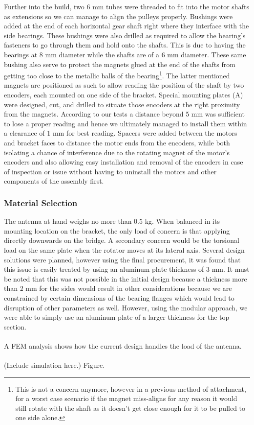 Further into the build, two 6 mm tubes were threaded to fit into the motor shafts as extensions so we can manage to align the pulleys properly. Bushings were added at the end of each horizontal gear shaft right where they interface with the side bearings. These bushings were also drilled as required to allow the bearing's fasteners to go through them and hold onto the shafts. This is due to having the bearings at 8 mm diameter while the shafts are of a 6 mm diameter. These same bushing also serve to protect the magnets glued at the end of the shafts from getting too close to the metallic balls of the bearing\footnote{This is not a concern anymore, however in a previous method of attachment, for a worst case scenario if the magnet miss-aligns for any reason it would still rotate with the shaft as it doesn't get close enough for it to be pulled to one side alone.}. The latter mentioned magnets are positioned as such to allow reading the position of the shaft by two encoders, each mounted on one side of the bracket. Special mounting plates (A) were designed, cut, and drilled to situate those encoders at the right proximity from the magnets. According to our tests a distance beyond 5 mm was sufficient to lose a proper reading and hence we ultimately managed to install them within a clearance of 1 mm for best reading. Spacers were added between the motors and bracket faces to distance the motor ends from the encoders, while both isolating a chance of interference due to the rotating magnet of the motor's encoders and also allowing easy installation and removal of the encoders in case of inspection or issue without having to uninstall the motors and other components of the assembly first.

\subsubsection*{Material Selection}
The antenna at hand weighs no more than 0.5 kg. When balanced in its mounting location on the bracket, the only load of concern is that applying directly downwards on the bridge. A secondary concern would be the torsional load on the same plate when the rotator moves at its lateral axis. Several design solutions were planned, however using the final procurement, it was found that this issue is easily treated by using an aluminum plate thickness of 3 mm. It must be noted that this was not possible in the initial design because a thickness more than 2 mm for the sides would result in other considerations because we are constrained by certain dimensions of the bearing flanges which would lead to disruption of other parameters as well. However, using the modular approach, we were able to simply use an aluminum plate of a larger thickness for the top section.\\
\\
A FEM analysis shows how the current design handles the load of the antenna.\\
\\
(Include simulation here.) Figure.

